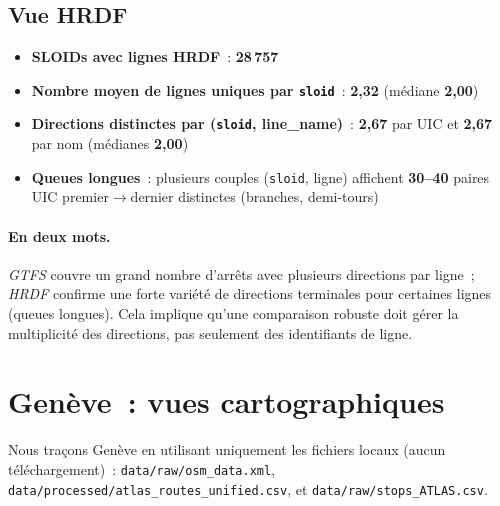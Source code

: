 \subsection*{Vue HRDF}
\begin{itemize}
  \item \textbf{SLOIDs avec lignes HRDF} : \textbf{28\,757}
  \item \textbf{Nombre moyen de lignes uniques par \texttt{sloid}} : \textbf{2,32} (médiane \textbf{2,00})
  \item \textbf{Directions distinctes par (\texttt{sloid}, line\_name)} : \textbf{2,67} par UIC et \textbf{2,67} par nom (médianes \textbf{2,00})
  \item \textbf{Queues longues} : plusieurs couples (\texttt{sloid}, ligne) affichent \textbf{30–40} paires UIC premier$\rightarrow$dernier distinctes (branches, demi-tours)
\end{itemize}

\paragraph{En deux mots.} \emph{GTFS} couvre un grand nombre d'arrêts avec plusieurs directions par ligne ; \emph{HRDF} confirme une forte variété de directions terminales pour certaines lignes (queues longues). Cela implique qu'une comparaison robuste doit gérer la multiplicité des directions, pas seulement des identifiants de ligne.

\section{Genève : vues cartographiques}
Nous traçons Genève en utilisant uniquement les fichiers locaux (aucun téléchargement) : \texttt{data/raw/osm\_data.xml}, \texttt{data/processed/atlas\_routes\_unified.csv}, et \texttt{data/raw/stops\_ATLAS.csv}.

